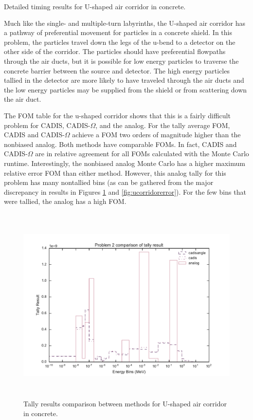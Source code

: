 \begin{table}[h!]
  \centering
  
  \caption[Detailed timing results for U-shaped air corridor in concrete.]
  {Detailed timing results for U-shaped air corridor in concrete.}
  \label{tab:ucorridortimes}
\end{table}

Much like the single- and multiple-turn labyrinths, the U-shaped air corridor
has a pathway of preferential movement for particles in a concrete shield. In
this problem, the particles travel down the legs of the u-bend to a detector on
the other side of the corridor. The particles should have preferential flowpaths
through the air ducts, but it is possible for low energy particles to traverse
the concrete barrier between the source and detector. The high energy particles
tallied in the detector are more likely to have traveled through the air ducts
and the low energy particles may be supplied from the shield or from scattering
down the air duct.

The FOM table for the u-shaped corridor shows that this is a fairly difficult
problem for CADIS, CADIS-$\Omega$, and the analog. For the tally average FOM,
CADIS and CADIS-$\Omega$ achieve a FOM two orders of magnitude higher than the
nonbiased analog. Both methods have comparable FOMs. In fact, CADIS and
CADIS-$\Omega$ are in relative agreement for all FOMs calculated with the Monte
Carlo runtime. Interestingly, the nonbiased analog Monte Carlo has a higher
maximum relative error FOM than either method. However, this analog tally for
this problem has many
nontallied bins (as can be gathered from the major discrepancy in results in
Figures \ref{fig:ucorridorresult} and \ref{fig:ucorridorerror}). For the
few bins that were tallied, the analog has a high FOM.

\begin{figure}[h!]
  \centering
  \includegraphics[height=10cm]{./chapters/characterization_probs/figures/char/prob_2/problem_2_tally_result_compare.pdf}
  \caption[Tally results comparison between methods for U-shaped air corridor in
  concrete.]
  {Tally results comparison between methods for U-shaped air corridor in
  concrete.}
  \label{fig:ucorridorresult}
\end{figure}

